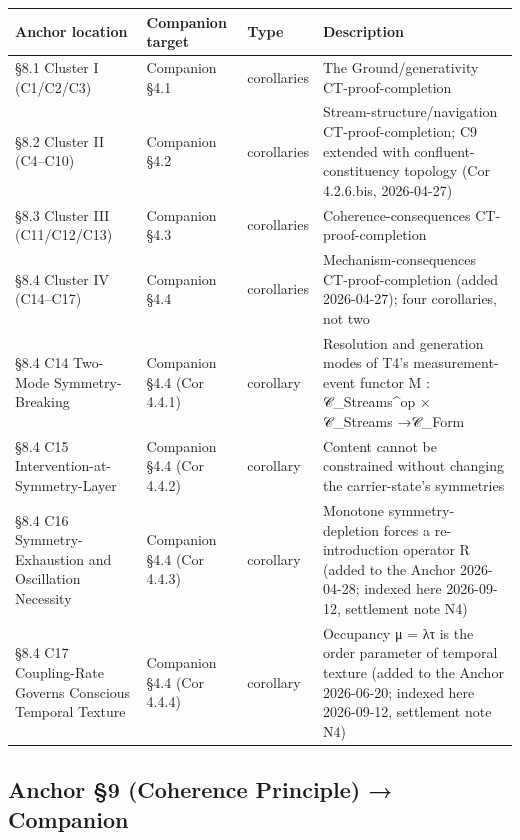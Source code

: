 \documentclass[11pt, openany]{book}
\begin{document}
\begingroup\setlength{\tabcolsep}{3pt}\renewcommand{\arraystretch}{1.15}\footnotesize
\begin{center}
\begin{tabular}{p{0.92in} p{0.53in} p{0.53in} p{2.28in}}
\toprule
Anchor location & Companion target & Type & Description \\
\midrule
§8.1 Cluster I (C1/\allowbreak C2/\allowbreak C3) & Companion §4.1 & corollaries & The Ground/\allowbreak generativity CT-proof-completion \\
§8.2 Cluster II (C4–C10) & Companion §4.2 & corollaries & Stream-structure/\allowbreak navigation CT-proof-completion; C9 extended with confluent-constituency topology (Cor 4.2.6.bis, 2026-04-27) \\
§8.3 Cluster III (C11/\allowbreak C12/\allowbreak C13) & Companion §4.3 & corollaries & Coherence-consequences CT-proof-completion \\
§8.4 Cluster IV (C14–C17) & Companion §4.4 & corollaries & Mechanism-consequences CT-proof-completion (added 2026-04-27); four corollaries, not two \\
§8.4 C14 Two-Mode Symmetry-Breaking & Companion §4.4 (Cor 4.4.1) & corollary & Resolution and generation modes of T4's measurement-event functor M : 𝒞\_\allowbreak{}Streams\textasciicircum{}op × 𝒞\_\allowbreak{}Streams →\allowbreak  𝒞\_\allowbreak{}Form \\
§8.4 C15 Intervention-at-Symmetry-Layer & Companion §4.4 (Cor 4.4.2) & corollary & Content cannot be constrained without changing the carrier-state's symmetries \\
§8.4 C16 Symmetry-Exhaustion and Oscillation Necessity & Companion §4.4 (Cor 4.4.3) & corollary & Monotone symmetry-depletion forces a re-introduction operator R (added to the Anchor 2026-04-28; indexed here 2026-09-12, settlement note N4) \\
§8.4 C17 Coupling-Rate Governs Conscious Temporal Texture & Companion §4.4 (Cor 4.4.4) & corollary & Occupancy μ = λτ is the order parameter of temporal texture (added to the Anchor 2026-06-20; indexed here 2026-09-12, settlement note N4) \\
\bottomrule
\end{tabular}
\end{center}
\endgroup
\subsection{Anchor §9 (Coherence Principle) → Companion}
\end{document}
